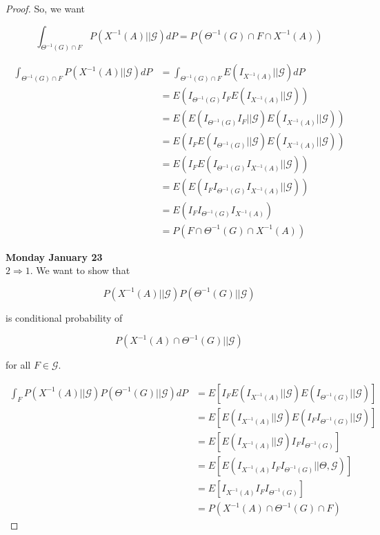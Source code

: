 \documentclass[11pt,fleqn]{book} %
\begin{document}
\begin{proof}
	So, we want

			$$\int_{\Theta^{-1}(G)\cap F} P(X^{-1}(A) || \mathcal{G}) dP = P(\Theta^{-1}(G) \cap F \cap X^{-1}(A)) $$


			\begin{align*}
				\int_{\Theta^{-1}(G)\cap F} P(X^{-1}(A) || \mathcal{G}) dP &= \int_{\Theta^{-1}(G) \cap F} E \left(I_{X^{-1}(A)} || \mathcal{G} \right) dP\\
						&= E\left(I_{\Theta^{-1}(G)} I_F E(I_{X^{-1}(A)} || \mathcal{G})\right)\\
						&= E\left( E(I_{\Theta^{-1}(G)} I_F || \mathcal{G}) E(I_{X^{-1}(A)} || \mathcal{G})\right)\\
						&= E\left( I_F E(I_{\Theta^{-1}(G)}  || \mathcal{G}) E(I_{X^{-1}(A)} || \mathcal{G})\right)\\
						&= E\left( I_F E(I_{\Theta^{-1}(G)} I_{X^{-1}(A)} || \mathcal{G})\right)\\
						&= E\left(  E(I_F I_{\Theta^{-1}(G)} I_{X^{-1}(A)} || \mathcal{G})\right)\\
						&= E\left( I_F I_{\Theta^{-1}(G)} I_{X^{-1}(A)}\right)\\
						&= P(F \cap \Theta^{-1}(G) \cap X^{-1}(A))
			\end{align*}

\textbf{Monday January 23}\\

	$2 \Rightarrow 1$. We want to show that 

			$$P(X^{-1}(A)|| \mathcal{G}) P(\Theta^{-1}(G) || \mathcal{G}) $$

		is conditional probability of 

			$$P(X^{-1}(A) \cap \Theta^{-1}(G)|| \mathcal{G}) $$

		for all $F \in \mathcal{G}$. 
		
				\begin{align*}
						\int_F P(X^{-1}(A)|| \mathcal{G})P(\Theta^{-1}(G) || \mathcal{G}) dP &= E\left[I_F E\left(I_{X^{-1}(A)} || \mathcal{G} \right) E\left(I_{\Theta^{-1}(G) }|| \mathcal{G} \right) \right]\\
								&= E\left[ E\left(I_{X^{-1}(A)} || \mathcal{G} \right) E\left(I_F I_{\Theta^{-1}(G) }|| \mathcal{G} \right) \right]\\
								&= E\left[ E\left(I_{X^{-1}(A)} || \mathcal{G} \right) I_F I_{\Theta^{-1}(G)} \right]\\
								&= E\left[ E\left(I_{X^{-1}(A)} I_F I_{\Theta^{-1}(G)}|| \Theta, \mathcal{G} \right)  \right]\\
								&= E\left[I_{X^{-1}(A)} I_F I_{\Theta^{-1}(G)} \right]\\
								&= P(X^{-1}(A) \cap \Theta^{-1}(G) \cap F)
					\end{align*}	


\end{proof}
\end{document}
